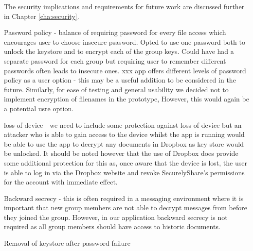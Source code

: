  The security implications and requirements for future work are discussed further in Chapter \ref{cha:security}.
 
Password policy - balance of requiring password for every file access which encourages user to choose insecure psasword.  Opted to use one password both to unlock the keystore and to encrypt each of the group keys.  Could have had a separate password for each group but requiring user to remember different passwords often leads to insecure ones.  xxx app offers different levels of password policy as a user option - this may be a useful addition to be considered in the future.   Similarly, for ease of testing and general usability we decided not to implement encryption of filenames in the prototype,  However, this would again be a potential usre option.
 
 loss of device - we need to include some protection against loss of device but an attacker who is able to gain access to the device whilst the app is running would be able to use the app to decrypt any documents in Dropbox as key store would be unlocked.  It should be noted however that the use of Dropbox does provide some additional protection for this as, once aware that the device is lost, the user is able to log in via the Dropbox website and revoke SecurelyShare's permissions for the account with immediate effect. 
 
Backward secrecy  - this is often required in a messaging environment where it is important that new group members are not able to decrypt messages from before they joined the group. However, in our application backward secrecy is not required as all group members should have access to historic documents.


Removal of keystore after password failure
 
\\
